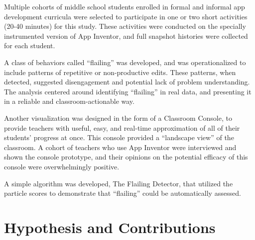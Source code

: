 Multiple cohorts of middle school students enrolled in formal and informal app development curricula were selected to participate in one or two short activities (20-40 minutes) for this study. These activities were conducted on the specially instrumented version of App Inventor, and full snapshot histories were collected for each student. 

A class of behaviors called ``flailing'' was developed, and was operationalized to include patterns of repetitive or non-productive edits. These patterns, when detected, suggested disengagement and potential lack of problem understanding. The analysis centered around identifying ``flailing'' in real data, and presenting it in a reliable and classroom-actionable way.

Another visualization was designed in the form of a Classroom Console, to provide teachers with useful, easy, and real-time approximation of all of their students' progress at once. This console provided a ``landscape view'' of the classroom. A cohort of teachers who use App Inventor were interviewed and shown the console prototype, and their opinions on the potential efficacy of this console were overwhelmingly positive. 

A simple algorithm was developed, The Flailing Detector, that utilized the particle scores to demonstrate that ``flailing'' could be automatically assessed. 



\section{Hypothesis and Contributions}


